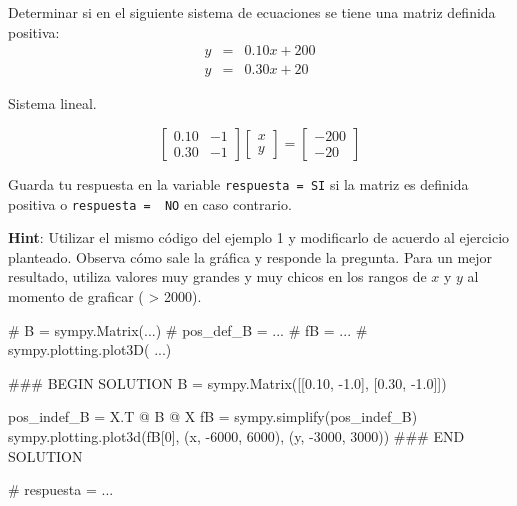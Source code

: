 \documentclass[
  letterpaper,
  DIV=11,
  numbers=noendperiod]{scrreprt}
\newenvironment{Shaded}{\begin{snugshade}}{\end{snugshade}}
\newcommand{\CommentTok}[1]{\textcolor[rgb]{0.37,0.37,0.37}{#1}}
\newcommand{\DecValTok}[1]{\textcolor[rgb]{0.68,0.00,0.00}{#1}}
\newcommand{\FloatTok}[1]{\textcolor[rgb]{0.68,0.00,0.00}{#1}}
\newcommand{\NormalTok}[1]{\textcolor[rgb]{0.00,0.23,0.31}{#1}}
\newcommand{\OperatorTok}[1]{\textcolor[rgb]{0.37,0.37,0.37}{#1}}
\newcommand{\RegionMarkerTok}[1]{\textcolor[rgb]{0.00,0.23,0.31}{#1}}
\begin{document}
Determinar si en el siguiente sistema de ecuaciones se tiene una matriz
definida positiva: \[
\begin{array}{ccc}
y & = & 0.10 x + 200 \\
y & = & 0.30 x + 20
\end{array}
\]

Sistema lineal.

\[
\left[
\begin{array}{cc}
0.10 & -1 \\
0.30 & -1
\end{array} \right]
\left[
\begin{array}{c}
x \\
y
\end{array} \right] =
\left[
\begin{array}{c}
-200 \\ 
-20
\end{array} \right] \tag{2}
\]

Guarda tu respuesta en la variable
\texttt{respuesta\ =\ \textquotesingle{}SI\textquotesingle{}} si la
matriz es definida positiva o
\texttt{respuesta\ =\ \ \textquotesingle{}NO\textquotesingle{}} en caso
contrario.

\textbf{Hint}: Utilizar el mismo código del ejemplo 1 y modificarlo de
acuerdo al ejercicio planteado. Observa cómo sale la gráfica y responde
la pregunta. Para un mejor resultado, utiliza valores muy grandes y muy
chicos en los rangos de \(x\) y \(y\) al momento de graficar (
\textgreater{} 2000).

\begin{Shaded}
\begin{Highlighting}[]
\CommentTok{\# B = sympy.Matrix(...)}
\CommentTok{\# pos\_def\_B = ...}
\CommentTok{\# fB = ...}
\CommentTok{\# sympy.plotting.plot3D( ...)}

\CommentTok{\#\#\# }\RegionMarkerTok{BEGIN}\CommentTok{ SOLUTION}
\NormalTok{B }\OperatorTok{=}\NormalTok{ sympy.Matrix([[}\FloatTok{0.10}\NormalTok{, }\OperatorTok{{-}}\FloatTok{1.0}\NormalTok{], [}\FloatTok{0.30}\NormalTok{, }\OperatorTok{{-}}\FloatTok{1.0}\NormalTok{]])}

\NormalTok{pos\_indef\_B }\OperatorTok{=}\NormalTok{ X.T }\OperatorTok{@}\NormalTok{ B }\OperatorTok{@}\NormalTok{ X}
\NormalTok{fB }\OperatorTok{=}\NormalTok{ sympy.simplify(pos\_indef\_B)}
\NormalTok{sympy.plotting.plot3d(fB[}\DecValTok{0}\NormalTok{], (x, }\OperatorTok{{-}}\DecValTok{6000}\NormalTok{, }\DecValTok{6000}\NormalTok{), (y, }\OperatorTok{{-}}\DecValTok{3000}\NormalTok{, }\DecValTok{3000}\NormalTok{))}
\CommentTok{\#\#\# }\RegionMarkerTok{END}\CommentTok{ SOLUTION}

\CommentTok{\# respuesta = ...}
\end{Highlighting}
\end{Shaded}
\end{document}
